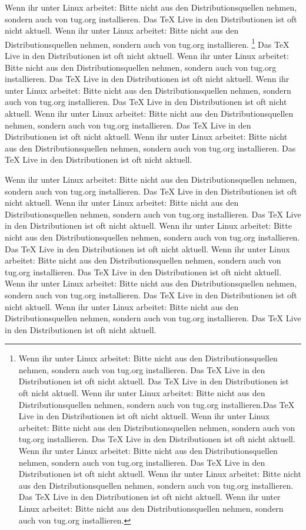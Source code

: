 \documentclass[ngerman,12pt,parskip=half]{scrreprt}
\begin{document}
Wenn ihr unter Linux arbeitet: Bitte nicht aus den Distributionsquellen nehmen, sondern auch von tug.org installieren. Das TeX Live in den Distributionen ist oft nicht aktuell. Wenn ihr unter Linux arbeitet: Bitte nicht aus den Distributionsquellen nehmen, sondern auch von tug.org installieren. \footnote{Wenn ihr unter Linux arbeitet: Bitte nicht aus den Distributionsquellen nehmen, sondern auch von tug.org installieren. Das TeX Live in den Distributionen ist oft nicht aktuell. Das TeX Live in den Distributionen ist oft nicht aktuell. Wenn ihr unter Linux arbeitet: Bitte nicht aus den Distributionsquellen nehmen, sondern auch von tug.org installieren.Das TeX Live in den Distributionen ist oft nicht aktuell. Wenn ihr unter Linux arbeitet: Bitte nicht aus den Distributionsquellen nehmen, sondern auch von tug.org installieren. Das TeX Live in den Distributionen ist oft nicht aktuell. Wenn ihr unter Linux arbeitet: Bitte nicht aus den Distributionsquellen nehmen, sondern auch von tug.org installieren. Das TeX Live in den Distributionen ist oft nicht aktuell. Wenn ihr unter Linux arbeitet: Bitte nicht aus den Distributionsquellen nehmen, sondern auch von tug.org installieren. Das TeX Live in den Distributionen ist oft nicht aktuell. Wenn ihr unter Linux arbeitet: Bitte nicht aus den Distributionsquellen nehmen, sondern auch von tug.org installieren.} Das TeX Live in den Distributionen ist oft nicht aktuell. Wenn ihr unter Linux arbeitet: Bitte nicht aus den Distributionsquellen nehmen, sondern auch von tug.org installieren. Das TeX Live in den Distributionen ist oft nicht aktuell. Wenn ihr unter Linux arbeitet: Bitte nicht aus den Distributionsquellen nehmen, sondern auch von tug.org installieren. Das TeX Live in den Distributionen ist oft nicht aktuell. Wenn ihr unter Linux arbeitet: Bitte nicht aus den Distributionsquellen nehmen, sondern auch von tug.org installieren. Das TeX Live in den Distributionen ist oft nicht aktuell. Wenn ihr unter Linux arbeitet: Bitte nicht aus den Distributionsquellen nehmen, sondern auch von tug.org installieren. Das TeX Live in den Distributionen ist oft nicht aktuell.

Wenn ihr unter Linux arbeitet: Bitte nicht aus den Distributionsquellen nehmen, sondern auch von tug.org installieren. Das TeX Live in den Distributionen ist oft nicht aktuell. Wenn ihr unter Linux arbeitet: Bitte nicht aus den Distributionsquellen nehmen, sondern auch von tug.org installieren. Das TeX Live in den Distributionen ist oft nicht aktuell. Wenn ihr unter Linux arbeitet: Bitte nicht aus den Distributionsquellen nehmen, sondern auch von tug.org installieren. Das TeX Live in den Distributionen ist oft nicht aktuell. Wenn ihr unter Linux arbeitet: Bitte nicht aus den Distributionsquellen nehmen, sondern auch von tug.org installieren. Das TeX Live in den Distributionen ist oft nicht aktuell. Wenn ihr unter Linux arbeitet: Bitte nicht aus den Distributionsquellen nehmen, sondern auch von tug.org installieren. Das TeX Live in den Distributionen ist oft nicht aktuell. Wenn ihr unter Linux arbeitet: Bitte nicht aus den Distributionsquellen nehmen, sondern auch von tug.org installieren. Das TeX Live in den Distributionen ist oft nicht aktuell.
\end{document}
